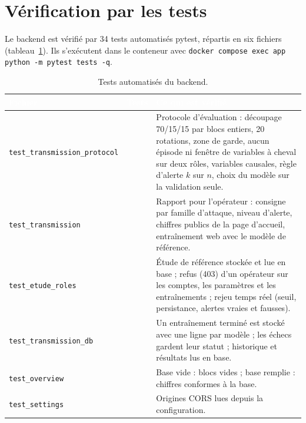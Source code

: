 \section{Vérification par les tests}

Le backend est vérifié par 34 tests automatisés pytest, répartis en six
fichiers (tableau~\ref{tab:tests}). Ils s'exécutent dans le conteneur avec
\texttt{docker compose exec app python -m pytest tests -q}.

\begin{table}[H]
\centering
\small
\renewcommand{\arraystretch}{1.4}
\setlength{\arrayrulewidth}{0.8pt}
\caption{Tests automatisés du backend.}
\label{tab:tests}
\begin{tabularx}{\textwidth}{@{}>{\raggedright\arraybackslash}p{4.8cm} >{\centering\arraybackslash}p{1.4cm} >{\raggedright\arraybackslash}X@{}}
\rowcolor{thead}
\textcolor{white}{\textbf{Fichier}} & \textcolor{white}{\textbf{Tests}} &
\textcolor{white}{\textbf{Ce qui est vérifié}} \\
\hline
\texttt{test\_transmission\_protocol} & 13 &
Protocole d'évaluation : découpage 70/15/15 par blocs entiers, 20 rotations,
zone de garde, aucun épisode ni fenêtre de variables à cheval sur deux rôles,
variables causales, règle d'alerte $k$ sur $n$, choix du modèle sur la
validation seule. \\
\rowcolor{trowa}
\texttt{test\_transmission} & 12 &
Rapport pour l'opérateur : consigne par famille d'attaque, niveau d'alerte,
chiffres publics de la page d'accueil, entraînement web avec le modèle de
référence. \\
\texttt{test\_etude\_roles} & 3 &
Étude de référence stockée et lue en base ; refus (403) d'un opérateur sur les
comptes, les paramètres et les entraînements ; rejeu temps réel (seuil,
persistance, alertes vraies et fausses). \\
\rowcolor{trowa}
\texttt{test\_transmission\_db} & 3 &
Un entraînement terminé est stocké avec une ligne par modèle ; les échecs
gardent leur statut ; historique et résultats lus en base. \\
\texttt{test\_overview} & 2 &
Base vide : blocs vides ; base remplie : chiffres conformes à la base. \\
\rowcolor{trowa}
\texttt{test\_settings} & 1 &
Origines CORS lues depuis la configuration. \\
\hline
\end{tabularx}
\end{table}

